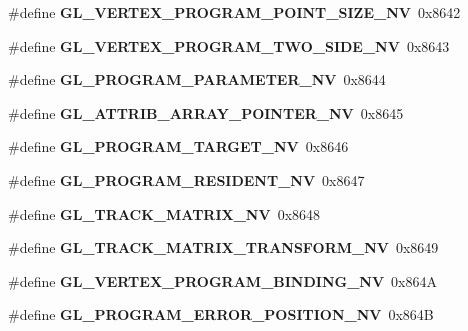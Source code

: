 \begin{DoxyCompactItemize}
\item 
\#define {\bfseries G\+L\+\_\+\+V\+E\+R\+T\+E\+X\+\_\+\+P\+R\+O\+G\+R\+A\+M\+\_\+\+P\+O\+I\+N\+T\+\_\+\+S\+I\+Z\+E\+\_\+\+N\+V}~0x8642\label{_s_d_l__opengl_8h_ad9217a671972a303a8b863a253f5b631}

\item 
\#define {\bfseries G\+L\+\_\+\+V\+E\+R\+T\+E\+X\+\_\+\+P\+R\+O\+G\+R\+A\+M\+\_\+\+T\+W\+O\+\_\+\+S\+I\+D\+E\+\_\+\+N\+V}~0x8643\label{_s_d_l__opengl_8h_a007ab043691b0dbc1b40b5c3cfb6cb3e}

\item 
\#define {\bfseries G\+L\+\_\+\+P\+R\+O\+G\+R\+A\+M\+\_\+\+P\+A\+R\+A\+M\+E\+T\+E\+R\+\_\+\+N\+V}~0x8644\label{_s_d_l__opengl_8h_aedcf0fb64d7e003fde2ac0b00b82a0ef}

\item 
\#define {\bfseries G\+L\+\_\+\+A\+T\+T\+R\+I\+B\+\_\+\+A\+R\+R\+A\+Y\+\_\+\+P\+O\+I\+N\+T\+E\+R\+\_\+\+N\+V}~0x8645\label{_s_d_l__opengl_8h_a8048490b9efe0cda02983be461c6e541}

\item 
\#define {\bfseries G\+L\+\_\+\+P\+R\+O\+G\+R\+A\+M\+\_\+\+T\+A\+R\+G\+E\+T\+\_\+\+N\+V}~0x8646\label{_s_d_l__opengl_8h_a692077ea3ca1b0a1e3591dcd61a0a0f5}

\item 
\#define {\bfseries G\+L\+\_\+\+P\+R\+O\+G\+R\+A\+M\+\_\+\+R\+E\+S\+I\+D\+E\+N\+T\+\_\+\+N\+V}~0x8647\label{_s_d_l__opengl_8h_ae7ba31118fee490050fd3a973d4d7381}

\item 
\#define {\bfseries G\+L\+\_\+\+T\+R\+A\+C\+K\+\_\+\+M\+A\+T\+R\+I\+X\+\_\+\+N\+V}~0x8648\label{_s_d_l__opengl_8h_af71f788cfcc0dce60be49adc185e2ec5}

\item 
\#define {\bfseries G\+L\+\_\+\+T\+R\+A\+C\+K\+\_\+\+M\+A\+T\+R\+I\+X\+\_\+\+T\+R\+A\+N\+S\+F\+O\+R\+M\+\_\+\+N\+V}~0x8649\label{_s_d_l__opengl_8h_a1fcc09e8d6bb2014baf1235317f5ff35}

\item 
\#define {\bfseries G\+L\+\_\+\+V\+E\+R\+T\+E\+X\+\_\+\+P\+R\+O\+G\+R\+A\+M\+\_\+\+B\+I\+N\+D\+I\+N\+G\+\_\+\+N\+V}~0x864\+A\label{_s_d_l__opengl_8h_ad312df7c68c51acaebaa633380543efa}

\item 
\#define {\bfseries G\+L\+\_\+\+P\+R\+O\+G\+R\+A\+M\+\_\+\+E\+R\+R\+O\+R\+\_\+\+P\+O\+S\+I\+T\+I\+O\+N\+\_\+\+N\+V}~0x864\+B\label{_s_d_l__opengl_8h_a98b6ed8fdbe1eed03982ff06434bbc0b}


\end{DoxyCompactItemize}
